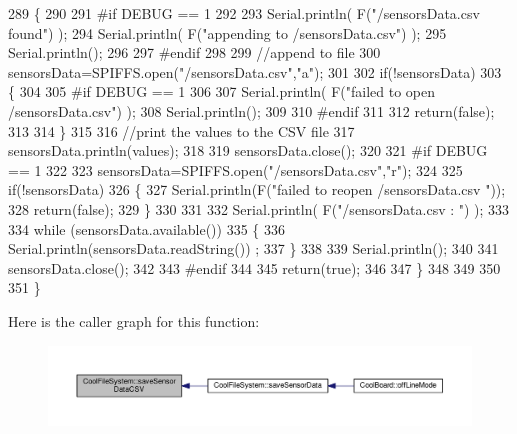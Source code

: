 \begin{DoxyCode}
289     \{
290 
291 \textcolor{preprocessor}{    #if DEBUG == 1}
292     
293         Serial.println( F(\textcolor{stringliteral}{"/sensorsData.csv  found"}) );
294         Serial.println( F(\textcolor{stringliteral}{"appending to /sensorsData.csv"}) );
295         Serial.println();
296     
297 \textcolor{preprocessor}{    #endif}
298 
299         \textcolor{comment}{//append to file}
300         sensorsData=SPIFFS.open(\textcolor{stringliteral}{"/sensorsData.csv"},\textcolor{stringliteral}{"a"});
301         
302         \textcolor{keywordflow}{if}(!sensorsData)
303         \{
304         
305 \textcolor{preprocessor}{        #if DEBUG == 1}
306             
307             Serial.println( F(\textcolor{stringliteral}{"failed to open /sensorsData.csv"}) );
308             Serial.println();
309 
310 \textcolor{preprocessor}{        #endif}
311             
312             \textcolor{keywordflow}{return}(\textcolor{keyword}{false});
313         
314         \}
315 
316         \textcolor{comment}{//print the values to the CSV file}
317         sensorsData.println(values);
318         
319         sensorsData.close();
320 
321 \textcolor{preprocessor}{    #if DEBUG == 1}
322 
323         sensorsData=SPIFFS.open(\textcolor{stringliteral}{"/sensorsData.csv"},\textcolor{stringliteral}{"r"});
324         
325         \textcolor{keywordflow}{if}(!sensorsData)
326         \{
327             Serial.println(F(\textcolor{stringliteral}{"failed to reopen /sensorsData.csv "}));
328             \textcolor{keywordflow}{return}(\textcolor{keyword}{false});      
329         \}
330 
331         
332         Serial.println( F(\textcolor{stringliteral}{"/sensorsData.csv : "}) );
333 
334         \textcolor{keywordflow}{while} (sensorsData.available()) 
335         \{
336             Serial.println(sensorsData.readString()) ;
337         \}
338         
339         Serial.println();
340         
341         sensorsData.close();
342         
343 \textcolor{preprocessor}{    #endif      }
344         
345         \textcolor{keywordflow}{return}(\textcolor{keyword}{true});
346     
347     \}   
348 
349 
350 
351 \}
\end{DoxyCode}
Here is the caller graph for this function\+:
\nopagebreak
\begin{figure}[H]
\begin{center}
\leavevmode
\includegraphics[width=350pt]{classCoolFileSystem_ab78704d5d21ce10fc6f1138ab5ab46c8_icgraph}
\end{center}
\end{figure}
\mbox{\label{classCoolFileSystem_adfa8e2e80641ae6f0cceabd348a9b841}} 
